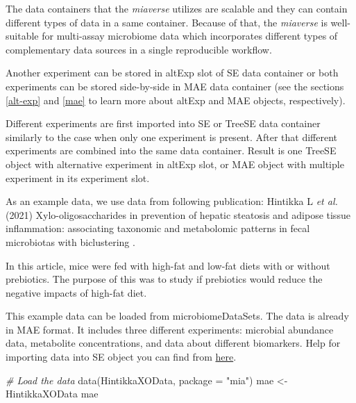 \documentclass[
]{book}
\newenvironment{Shaded}{\begin{snugshade}}{\end{snugshade}}
\newcommand{\AttributeTok}[1]{\textcolor[rgb]{0.77,0.63,0.00}{#1}}
\newcommand{\CommentTok}[1]{\textcolor[rgb]{0.56,0.35,0.01}{\textit{#1}}}
\newcommand{\FunctionTok}[1]{\textcolor[rgb]{0.00,0.00,0.00}{#1}}
\newcommand{\NormalTok}[1]{#1}
\newcommand{\OtherTok}[1]{\textcolor[rgb]{0.56,0.35,0.01}{#1}}
\newcommand{\StringTok}[1]{\textcolor[rgb]{0.31,0.60,0.02}{#1}}
\begin{document}
The data containers that the \emph{miaverse} utilizes are scalable and they
can contain different types of data in a same container. Because of
that, the \emph{miaverse} is well-suitable for multi-assay microbiome data
which incorporates different types of complementary data sources in a
single reproducible workflow.

Another experiment can be stored in altExp slot of SE data container
or both experiments can be stored side-by-side in MAE data container
(see the sections \ref{alt-exp} and \ref{mae} to learn more about
altExp and MAE objects, respectively).

Different experiments are first imported into SE or TreeSE data
container similarly to the case when only one experiment is
present. After that different experiments are combined into the same
data container. Result is one TreeSE object with alternative
experiment in altExp slot, or MAE object with multiple experiment in
its experiment slot.

As an example data, we use data from following publication: Hintikka L
\emph{et al.} (2021) Xylo-oligosaccharides in prevention of hepatic
steatosis and adipose tissue inflammation: associating taxonomic and
metabolomic patterns in fecal microbiotas with biclustering
\citep{Hintikka2021}.

In this article, mice were fed with high-fat and low-fat diets with or
without prebiotics. The purpose of this was to study if prebiotics
would reduce the negative impacts of high-fat diet.

This example data can be loaded from microbiomeDataSets. The data is
already in MAE format. It includes three different experiments:
microbial abundance data, metabolite concentrations, and data about
different biomarkers. Help for importing data into SE object you can
find from
\href{https://microbiome.github.io/OMA/containers.html\#loading-experimental-microbiome-data}{here}.

\begin{Shaded}
\begin{Highlighting}[]
\CommentTok{\# Load the data}
\FunctionTok{data}\NormalTok{(HintikkaXOData, }\AttributeTok{package =} \StringTok{"mia"}\NormalTok{)}
\NormalTok{mae }\OtherTok{\textless{}{-}}\NormalTok{ HintikkaXOData}
\NormalTok{mae}
\end{Highlighting}
\end{Shaded}
\end{document}
